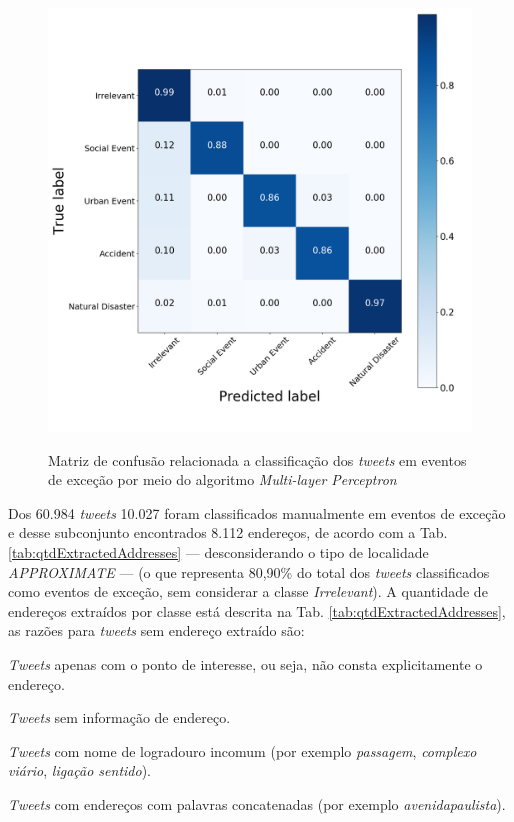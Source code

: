 \documentclass[
	12pt,				%
	oneside,			%
	a4paper,			%
	english,			%
	brazil				%
	]{abntex2ppgsi}
\begin{document}
\begin{figure}[!htb]
	\centering
 	  \caption{Matriz de confusão relacionada a classificação dos \textit{tweets} em eventos de exceção por meio do algoritmo \textit{Multi-layer Perceptron}}
		\includegraphics[width=1\linewidth]{images/confusion_matrix_mlp.png}
	\label{fig:confusion_matrix_mlpc}
\end{figure}

Dos 60.984 \textit{tweets} 10.027 foram classificados manualmente em eventos de exceção e desse subconjunto encontrados 8.112 endereços, de acordo com a Tab. \ref{tab:qtdExtractedAddresses} --- desconsiderando o tipo de localidade \textit{APPROXIMATE} --- (o que representa 80,90\% do total dos \textit{tweets} classificados como eventos de exceção, sem considerar a classe \textit{Irrelevant}). A quantidade de endereços extraídos por classe está descrita na Tab. \ref{tab:qtdExtractedAddresses}, as razões para \textit {tweets} sem endereço extraído são:

\begin{enumerate*}
\item \textit{Tweets} apenas com o ponto de interesse, ou seja, não consta explicitamente o endereço.
\item \textit{Tweets} sem informação de endereço.
\item \textit{Tweets} com nome de logradouro incomum (por exemplo \emph{passagem}, \emph{complexo viário}, \emph{ligação sentido}).
\item \textit{Tweets} com endereços com palavras concatenadas (por exemplo \emph{avenidapaulista}).
\end{enumerate*}
\end{document}
